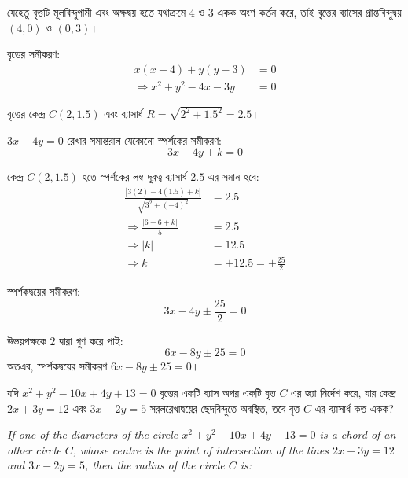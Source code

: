 \documentclass[12pt, a4paper]{article}
\begin{document}
\begin{tcolorbox}[solutionbox={সমাধান (Solution)}]
    \noindent
    যেহেতু বৃত্তটি মূলবিন্দুগামী এবং অক্ষদ্বয় হতে যথাক্রমে $4$ ও $3$ একক অংশ কর্তন করে, তাই বৃত্তের ব্যাসের প্রান্তবিন্দুদ্বয় $(4, 0)$ ও $(0, 3)$। 
    
    বৃত্তের সমীকরণ: 
    \begin{align*}
        x(x - 4) + y(y - 3) &= 0 \\
        \Rightarrow x^2 + y^2 - 4x - 3y &= 0
    \end{align*}
    
    বৃত্তের কেন্দ্র $C(2, 1.5)$ এবং ব্যাসার্ধ $R = \sqrt{2^2 + 1.5^2} = 2.5$। 
    
    $3x - 4y = 0$ রেখার সমান্তরাল যেকোনো স্পর্শকের সমীকরণ: 
    \[ 3x - 4y + k = 0 \]
    
    কেন্দ্র $C(2, 1.5)$ হতে স্পর্শকের লম্ব দূরত্ব ব্যাসার্ধ $2.5$ এর সমান হবে:
    \begin{align*}
        \frac{|3(2) - 4(1.5) + k|}{\sqrt{3^2 + (-4)^2}} &= 2.5 \\
        \Rightarrow \frac{|6 - 6 + k|}{5} &= 2.5 \\
        \Rightarrow |k| &= 12.5 \\
        \Rightarrow k &= \pm 12.5 = \pm\frac{25}{2}
    \end{align*}
    
    স্পর্শকদ্বয়ের সমীকরণ: 
    \[ 3x - 4y \pm \frac{25}{2} = 0 \]
    
    উভয়পক্ষকে $2$ দ্বারা গুণ করে পাই: 
    \[ 6x - 8y \pm 25 = 0 \]
    অতএব, স্পর্শকদ্বয়ের সমীকরণ \textbf{$6x - 8y \pm 25 = 0$}।
\end{tcolorbox}

\vspace{2em}

\begin{tcolorbox}[questionbox={প্রশ্ন (Question) 20}]
    \noindent
    যদি $x^2 + y^2 - 10x + 4y + 13 = 0$ বৃত্তের একটি ব্যাস অপর একটি বৃত্ত $C$ এর জ্যা নির্দেশ করে, যার কেন্দ্র $2x + 3y = 12$ এবং $3x - 2y = 5$ সরলরেখাদ্বয়ের ছেদবিন্দুতে অবস্থিত, তবে বৃত্ত $C$ এর ব্যাসার্ধ কত একক?
    
    \vspace{0.8em}
    \begin{english}
    \noindent\textit{\color{darkgray}
    If one of the diameters of the circle $x^2 + y^2 - 10x + 4y + 13 = 0$ is a chord of another circle $C$, whose centre is the point of intersection of the lines $2x + 3y = 12$ and $3x - 2y = 5$, then the radius of the circle $C$ is:
    }
    \end{english}
\end{tcolorbox}
\end{document}
